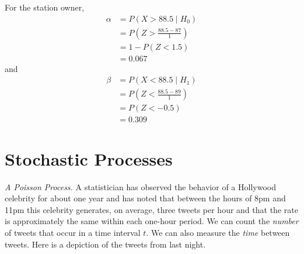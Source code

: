 For the station owner,
\begin{align*}
\alpha &= P(X > 88.5 \mid H_0) \\
&= P\left( Z > \frac{88.5-87}{1} \right) \\
&= 1 - P(Z < 1.5) \\
&= 0.067
\end{align*}
and
\begin{align*}
\beta &= P(X < 88.5 \mid H_1) \\
&= P\left( Z < \frac{88.5-89}{1} \right) \\
&= P(Z < -0.5) \\
&= 0.309
\end{align*}


\section{Stochastic Processes}

\emph{A Poisson Process.} A statistician has observed the behavior of
a Hollywood celebrity for about one year and has noted that between
the hours of 8pm and 11pm this celebrity generates, on average, three
tweets per hour and that the rate is approximately the same within
each one-hour period.  We can count the \emph{number} of tweets that
occur in a time interval $t$. We can also measure the \emph{time}
between tweets. Here is a depiction of the tweets from last night.

\vspace{.2in}
\begin{center}
\end{center}

